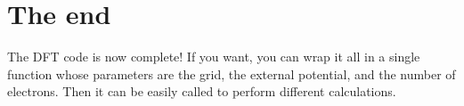 \documentclass{article}
\begin{document}

\section*{The end}

The DFT code is now complete!  If you want, you can wrap it all in a
single function whose parameters are the grid, the external potential,
and the number of electrons.  Then it can be easily called to perform
different calculations.
\end{document}
